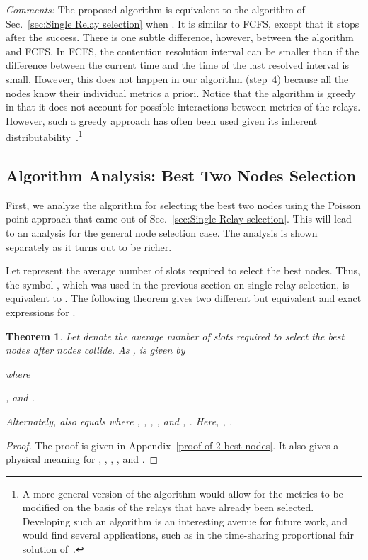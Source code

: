 \documentclass[12pt,draftcls,peerreview, onecolumn]{IEEEtran}
\newtheorem{theorem}{{\bf Theorem}}
\begin{document}
{\em Comments:} The proposed algorithm is equivalent to the algorithm
of Sec.~\ref{sec:Single Relay selection} when . It is similar to
FCFS, except that it stops after the  success. There is one
subtle difference, however, between the algorithm and FCFS. In FCFS,
the contention resolution interval can be smaller than  if the
difference between the current time and the time of the last resolved
interval is small.  However, this does not happen in our algorithm
(step~4) because all the nodes know their individual metrics a priori.
Notice that the algorithm is greedy in that it does not account for
possible interactions between metrics of the relays.  However, such a
greedy approach has often been used given its inherent
distributability~\cite{ding_TWC_2009}.\footnote{A more general version
  of the algorithm would allow for the metrics to be modified on the
  basis of the relays that have already been selected.  Developing
  such an algorithm is an interesting avenue for future work, and
  would find several applications, such as in the time-sharing
  proportional fair solution of~\cite{oechtering_TWC_2008}.}



\subsection{Algorithm Analysis:  Best Two Nodes Selection}

First, we analyze the algorithm for selecting the best two nodes using
the Poisson point approach that came out of Sec.~\ref{sec:Single Relay
  selection}.  This will lead to an analysis for the general 
node selection case. The  analysis is shown separately as it
turns out to be richer.

Let  represent the average number of slots
required to select the best  nodes. Thus, the symbol
, which was used in the previous section on
single relay selection, is equivalent to .
The following theorem gives two different but equivalent and exact
expressions for .
\begin{theorem}
\label{2 best nodes}
Let  denote the average number of slots required to select
the best  nodes after  nodes collide. As ,
 is given by

where

 , and .

Alternately,  also equals 
 where
, ,
,
 , and , .
Here, 
,
.
\end{theorem}
\begin{proof}
The proof is given in Appendix~\ref{proof of 2 best nodes}. It also
  gives a physical meaning for , , , ,
  and .
\end{proof}
\end{document}
